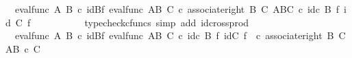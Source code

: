 \begin{isabellebody}
\ {\isachardoublequoteopen}{\isachardot}{\kern0pt}{\isachardot}{\kern0pt}{\isachardot}{\kern0pt}\ {\isacharequal}{\kern0pt}{\isacharparenleft}{\kern0pt}eval{\isacharunderscore}{\kern0pt}func\ A\ B{\isacharparenright}{\kern0pt}\ {\isasymcirc}\isactrlsub c\ {\isacharparenleft}{\kern0pt}id{\isacharparenleft}{\kern0pt}B{\isacharparenright}{\kern0pt}{\isasymtimes}\isactrlsub f\ eval{\isacharunderscore}{\kern0pt}func\ {\isacharparenleft}{\kern0pt}A\isactrlbsup B\isactrlesup {\isacharparenright}{\kern0pt}\ C{\isacharparenright}{\kern0pt}\ {\isasymcirc}\isactrlsub c\ {\isacharparenleft}{\kern0pt}associate{\isacharunderscore}{\kern0pt}right\ B\ C\ {\isacharparenleft}{\kern0pt}{\isacharparenleft}{\kern0pt}A\isactrlbsup B\isactrlesup {\isacharparenright}{\kern0pt}\isactrlbsup C\isactrlesup {\isacharparenright}{\kern0pt}{\isacharparenright}{\kern0pt}\ {\isasymcirc}\isactrlsub c\ {\isacharparenleft}{\kern0pt}{\isacharparenleft}{\kern0pt}id\isactrlsub c\ {\isacharparenleft}{\kern0pt}B{\isacharparenright}{\kern0pt}\ {\isasymtimes}\isactrlsub f\ id{\isacharparenleft}{\kern0pt}\ C{\isacharparenright}{\kern0pt}{\isacharparenright}{\kern0pt}\ {\isasymtimes}\isactrlsub f\ {\isasymphi}\isactrlsup {\isasymsharp}\isactrlsup {\isasymsharp}{\isacharparenright}{\kern0pt}{\isachardoublequoteclose}\isanewline
\ \ \ \ \ \ \ \ \isamarkupfalse%
\ {\isacharparenleft}{\kern0pt}typecheck{\isacharunderscore}{\kern0pt}cfuncs{\isacharcomma}{\kern0pt}\ simp\ add{\isacharcolon}{\kern0pt}\ id{\isacharunderscore}{\kern0pt}cross{\isacharunderscore}{\kern0pt}prod{\isacharparenright}{\kern0pt}\isanewline
\ \ \ \ \ \ \isamarkupfalse%
\ \isamarkupfalse%
\ {\isachardoublequoteopen}{\isachardot}{\kern0pt}{\isachardot}{\kern0pt}{\isachardot}{\kern0pt}\ {\isacharequal}{\kern0pt}{\isacharparenleft}{\kern0pt}eval{\isacharunderscore}{\kern0pt}func\ A\ B{\isacharparenright}{\kern0pt}\ {\isasymcirc}\isactrlsub c\ {\isacharparenleft}{\kern0pt}{\isacharparenleft}{\kern0pt}id{\isacharparenleft}{\kern0pt}B{\isacharparenright}{\kern0pt}{\isasymtimes}\isactrlsub f\ eval{\isacharunderscore}{\kern0pt}func\ {\isacharparenleft}{\kern0pt}A\isactrlbsup B\isactrlesup {\isacharparenright}{\kern0pt}\ C{\isacharparenright}{\kern0pt}\ {\isasymcirc}\isactrlsub c\ {\isacharparenleft}{\kern0pt}{\isacharparenleft}{\kern0pt}id\isactrlsub c\ {\isacharparenleft}{\kern0pt}B{\isacharparenright}{\kern0pt}\ {\isasymtimes}\isactrlsub f\ {\isacharparenleft}{\kern0pt}id{\isacharparenleft}{\kern0pt}C{\isacharparenright}{\kern0pt}\ {\isasymtimes}\isactrlsub f\ {\isasymphi}\isactrlsup {\isasymsharp}\isactrlsup {\isasymsharp}{\isacharparenright}{\kern0pt}{\isacharparenright}{\kern0pt}\ {\isasymcirc}\isactrlsub c\ {\isacharparenleft}{\kern0pt}associate{\isacharunderscore}{\kern0pt}right\ B\ C\ {\isacharparenleft}{\kern0pt}A\isactrlbsup {\isacharparenleft}{\kern0pt}B\ {\isasymtimes}\isactrlsub c\ C{\isacharparenright}{\kern0pt}\isactrlesup {\isacharparenright}{\kern0pt}{\isacharparenright}{\kern0pt}{\isacharparenright}{\kern0pt}{\isacharparenright}{\kern0pt}{\isachardoublequoteclose}\isanewline

\end{isabellebody}
